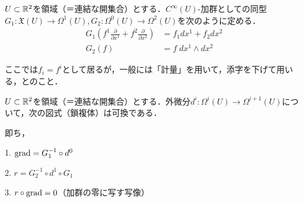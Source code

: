 \documentclass[uplatex, dvipdfmx]{jsreport}
\begin{document}
\begin{definition}[２次元の場合]
    $U\subset\mathbb{R}^2$を領域（＝連結な開集合）とする．$C^\infty(U)$-加群としての同型$G_1:\mathfrak{X}(U)\to\Omega^1(U), G_2:\Omega^0(U)\to\Omega^2(U)$を次のように定める．
    \begin{align*}
        G_1(f^1\frac{\partial}{\partial x^1}+f^2\frac{\partial}{\partial x^2}) &= f_1dx^1+f_2dx^2 \\
        G_2(f) &= f\;dx^1\wedge dx^2
    \end{align*}
\end{definition}
\begin{remark}
    ここでは$f_i=f^i$として居るが，一般には「計量」を用いて，添字を下げて用いる，とのこと．
\end{remark}
\begin{proposition}[$r,\grad$]
    $U\subset\mathbb{R}^2$を領域（＝連結な開集合）とする．外微分$d^i:\Omega^i(U)\to\Omega^{i+1}(U)$について，次の図式（鎖複体）は可換である．
    \begin{center}
    \end{center}
    即ち，

    1. $\operatorname{\mathrm{grad}} = G^{-1}_1\circ d^0$

    2. $r=G^{-1}_2\circ d^1\circ G_1$

    3. $r\circ\operatorname{\mathrm{grad}}=0$（加群の零に写す写像）
\end{proposition}
\end{document}
